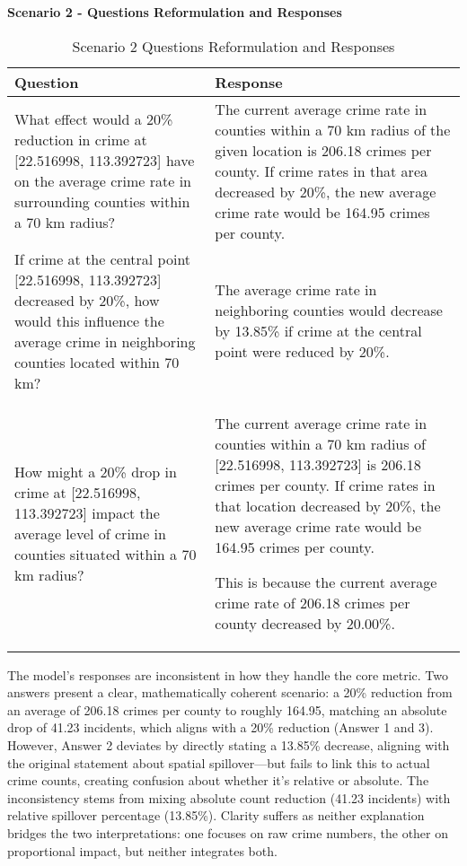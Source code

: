 \noindent \textbf{Scenario 2 - Questions Reformulation and Responses}
\begin{table}[H]
\centering
\caption{Scenario 2 Questions Reformulation and Responses}
\label{tab:questions_responses_2}
\begin{tabular}{|p{}|p{}|}
\hline
\textbf{Question} & \textbf{Response} \\
\hline
What effect would a 20\% reduction in crime at [22.516998, 113.392723] have on the average crime rate in surrounding counties within a 70 km radius? & The current average crime rate in counties within a 70 km radius of the given location is 206.18 crimes per county. If crime rates in that area decreased by 20\%, the new average crime rate would be 164.95 crimes per county. \\
\hline
If crime at the central point [22.516998, 113.392723] decreased by 20\%, how would this influence the average crime in neighboring counties located within 70 km? & The average crime rate in neighboring counties would decrease by 13.85\% if crime at the central point were reduced by 20\%. \\
\hline
How might a 20\% drop in crime at [22.516998, 113.392723] impact the average level of crime in counties situated within a 70 km radius? & 
The current average crime rate in counties within a 70 km radius of [22.516998, 113.392723] is 206.18 crimes per county. If crime rates in that location decreased by 20\%, the new average crime rate would be 164.95 crimes per county. 

This is because the current average crime rate of 206.18 crimes per county decreased by 20.00\%. \\
\hline
\end{tabular}
\end{table}

The model's responses are inconsistent in how they handle the core metric. Two answers present a clear, mathematically coherent scenario: a 20\% reduction from an average of 206.18 crimes per county to roughly 164.95, matching an absolute drop of 41.23 incidents, which aligns with a 20\% reduction (Answer 1 and 3). However, Answer 2 deviates by directly stating a 13.85\% decrease, aligning with the original statement about spatial spillover—but fails to link this to actual crime counts, creating confusion about whether it's relative or absolute. The inconsistency stems from mixing absolute count reduction (41.23 incidents) with relative spillover percentage (13.85\%). Clarity suffers as neither explanation bridges the two interpretations: one focuses on raw crime numbers, the other on proportional impact, but neither integrates both.


